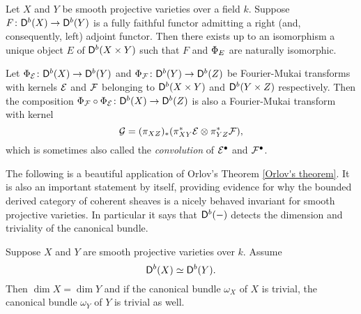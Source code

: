 \begin{remark}
    
\end{remark}

\begin{theorem}
    \label{Orlov's theorem}
    Let $X$ and $Y$ be smooth projective varieties over a field $k$. Suppose $F \colon \mathsf{D}^b(X) \to \mathsf{D}^b(Y)$ is a fully faithful functor admitting a right (and, consequently, left) adjoint functor. Then there exists up to an isomorphism a unique object $E$ of $\mathsf{D}^b(X \times Y)$ such that $F$ and $\Phi_{E}$ are naturally isomorphic.
\end{theorem}

\begin{proposition}
    \label{Composition of fm is fm}
    Let $\Phi_{\mathcal E} \colon \mathsf{D}^b(X) \to \mathsf{D}^b(Y)$ and $\Phi_{\mathcal F} \colon \mathsf{D}^b(Y) \to \mathsf{D}^b(Z)$ be Fourier-Mukai transforms with kernels $\mathcal E$ and $\mathcal F$ belonging to $\mathsf{D}^b(X \times Y)$ and $\mathsf{D}^b(Y \times Z)$ respectively. Then the composition $\Phi_{\mathcal F} \circ \Phi_{\mathcal E} \colon \mathsf{D}^b(X) \to \mathsf{D}^b(Z)$ is also a Fourier-Mukai transform with kernel
    \[
        \mathcal G = (\pi_{XZ})_*(\pi_{XY}^*\mathcal E \otimes \pi_{YZ}^*\mathcal F),
    \]
    which is sometimes also called the \emph{convolution} of $\mathcal E^\bullet$ and $\mathcal F^\bullet$.
\end{proposition}

The following is a beautiful application of Orlov's Theorem \ref{Orlov's theorem}. It is also an important statement by itself, providing evidence for why the bounded derived category of coherent sheaves is a nicely behaved invariant for smooth projective varieties. In particular it says that $\mathsf{D}^b(-)$ detects the dimension and triviality of the canonical bundle.  
\begin{theorem}
    \label{Db detects dimension and triviality of canonical bundle}
    Suppose $X$ and $Y$ are smooth projective varieties over $k$. Assume
    \[
        \mathsf{D}^b(X) \simeq \mathsf{D}^b(Y).
    \]
    Then $\dim X = \dim Y$ and if the canonical bundle $\omega_X$ of $X$ is trivial, the canonical bundle $\omega_Y$ of $Y$ is trivial as well.
\end{theorem}

